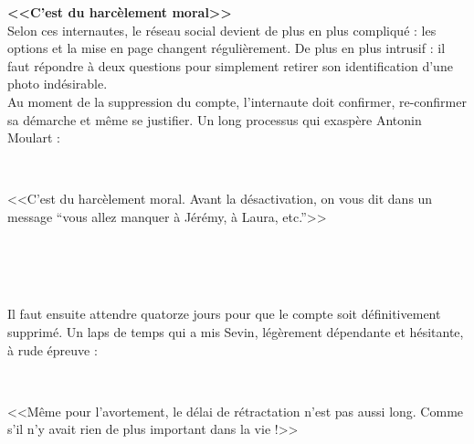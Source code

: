 \documentclass[11pt,twoside,a4paper]{article}
\begin{document}
\textbf{<<C'est du harc{\`e}lement moral>>}~\\

Selon ces internautes, le r{\'e}seau social devient de plus en plus compliqu{\'e} : les options et la mise en page changent r{\'e}guli{\`e}rement. De plus en plus intrusif : il faut r{\'e}pondre {\`a} deux questions pour simplement retirer son identification d'une photo ind{\'e}sirable. ~\\

Au moment de la suppression du compte, l'internaute doit confirmer, re-confirmer sa d{\'e}marche et m{\^e}me se justifier. Un long processus qui exasp{\`e}re Antonin Moulart : ~\\

\begin{minipage}[h]{0.10\textwidth} ~\\ \end{minipage} \hfill \begin{minipage}[h]{0.70\textwidth}
	<<C'est du harc{\`e}lement moral. Avant la d{\'e}sactivation, on vous dit dans un message ``vous allez manquer {\`a} J{\'e}r{\'e}my, {\`a} Laura, etc.''>>
\end{minipage} \hfill \begin{minipage}[h]{0.15\textwidth} ~\\ \end{minipage} ~\\~\\

Il faut ensuite attendre quatorze jours pour que le compte soit d{\'e}finitivement supprim{\'e}. Un laps de temps qui a mis Sevin, l{\'e}g{\`e}rement d{\'e}pendante et h{\'e}sitante, {\`a} rude {\'e}preuve : ~\\

\begin{minipage}[h]{0.10\textwidth} ~\\ \end{minipage} \hfill \begin{minipage}[h]{0.70\textwidth}
	<<M{\^e}me pour l'avortement, le d{\'e}lai de r{\'e}tractation n'est pas aussi long. Comme s'il n'y avait rien de plus important dans la vie !>>
\end{minipage} \hfill \begin{minipage}[h]{0.15\textwidth} ~\\ \end{minipage} ~\\~\\
\end{document}
